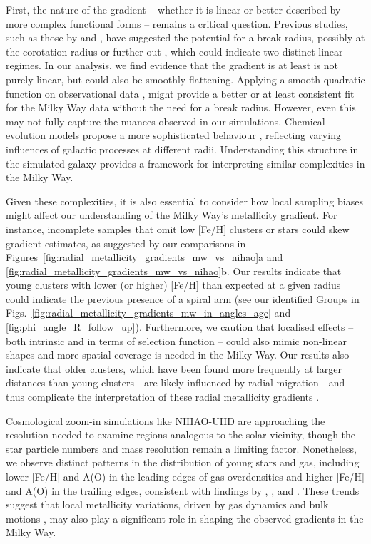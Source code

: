 \documentclass[twocolumn,apj,numberedappendix,appendixfloats,twocolappendix]{openjournal}
\begin{document}
\begin{CJK*}{UTF8}{gbsn}
First, the nature of the gradient -- whether it is linear or better described by more complex functional forms -- remains a critical question. Previous studies, such as those by \citet{Lepine2011} and \citet{Donor2020}, have suggested the potential for a break radius, possibly at the corotation radius or further out \citep{Scarano2013}, which could indicate two distinct linear regimes. In our analysis, we find evidence that the gradient is at least is not purely linear, but could also be smoothly flattening. Applying a smooth quadratic function on observational data \citep{Yong2012, Andrievsky2004, Genovali2014}, might provide a better or at least consistent fit for the Milky Way data without the need for a break radius. However, even this may not fully capture the nuances observed in our simulations. Chemical evolution models propose a more sophisticated behaviour \citep[e.g.][]{Chiappini2001, Kubryk2015, Palla2024}, reflecting varying influences of galactic processes at different radii. Understanding this structure in the simulated galaxy provides a framework for interpreting similar complexities in the Milky Way.

Given these complexities, it is also essential to consider how local sampling biases might affect our understanding of the Milky Way's metallicity gradient. For instance, incomplete samples that omit low [Fe/H] clusters or stars could skew gradient estimates, as suggested by our comparisons in Figures~\ref{fig:radial_metallicity_gradients_mw_vs_nihao}a and \ref{fig:radial_metallicity_gradients_mw_vs_nihao}b. Our results indicate that young clusters with lower (or higher) [Fe/H] than expected at a given radius could indicate the previous presence of a spiral arm (see our identified Groups in Figs.~\ref{fig:radial_metallicity_gradients_mw_in_angles_age} and \ref{fig:phi_angle_R_follow_up}). Furthermore, we caution that localised effects -- both intrinsic and in terms of selection function -- could also mimic non-linear shapes and more spatial coverage is needed in the Milky Way. Our results also indicate that older clusters, which have been found more frequently at larger distances than young clusters - are likely influenced by radial migration - and thus complicate the interpretation of these radial metallicity gradients \citep{Magrini2009, Lepine2011}.

Cosmological zoom-in simulations like NIHAO-UHD are approaching the resolution needed to examine regions analogous to the solar vicinity, though the star particle numbers and mass resolution remain a limiting factor. Nonetheless, we observe distinct patterns in the distribution of young stars and gas, including lower [Fe/H] and A(O) in the leading edges of gas overdensities and higher [Fe/H] and A(O) in the trailing edges, consistent with findings by \citet{Grand2016}, \citet{Ho2017c}, and \citet{Kreckel2019}. These trends suggest that local metallicity variations, driven by gas dynamics and bulk motions \citep[see e.g.][]{Orr2023}, may also play a significant role in shaping the observed gradients in the Milky Way.


\end{CJK*}
\end{document}
